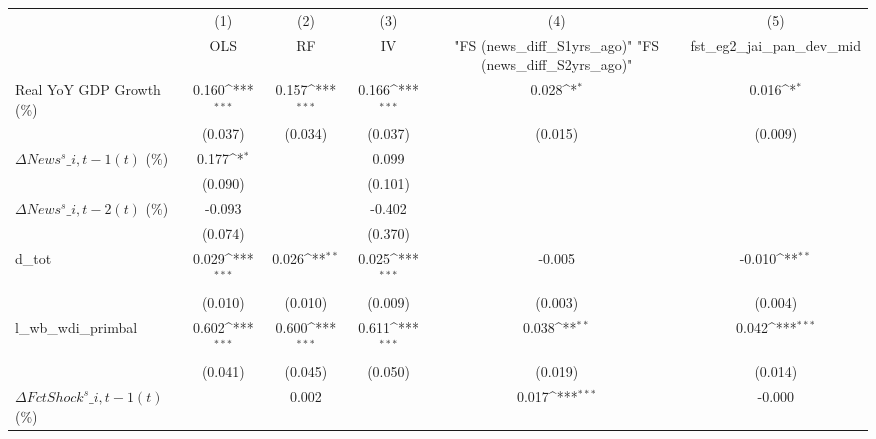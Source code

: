 {
\def\sym#1{\ifmmode^{#1}\else\(^{#1}\)\fi}
\begin{tabular}{l*{5}{c}}
\toprule
                    &\multicolumn{1}{c}{(1)}&\multicolumn{1}{c}{(2)}&\multicolumn{1}{c}{(3)}&\multicolumn{1}{c}{(4)}&\multicolumn{1}{c}{(5)}\\
                    &\multicolumn{1}{c}{OLS}&\multicolumn{1}{c}{RF}&\multicolumn{1}{c}{IV}&\multicolumn{1}{c}{ "FS (news\_diff\_S1yrs\_ago)"  "FS (news\_diff\_S2yrs\_ago)" }&\multicolumn{1}{c}{fst\_eg2\_jai\_pan\_dev\_mid}\\
\midrule
Real YoY GDP Growth (\%)&       0.160\sym{***}&       0.157\sym{***}&       0.166\sym{***}&       0.028\sym{*}  &       0.016\sym{*}  \\
                    &     (0.037)         &     (0.034)         &     (0.037)         &     (0.015)         &     (0.009)         \\
\addlinespace
$ \Delta News^s\_{i,t-1}(t)$ (\%)&       0.177\sym{*}  &                     &       0.099         &                     &                     \\
                    &     (0.090)         &                     &     (0.101)         &                     &                     \\
\addlinespace
$ \Delta News^s\_{i,t-2}(t)$ (\%)&      -0.093         &                     &      -0.402         &                     &                     \\
                    &     (0.074)         &                     &     (0.370)         &                     &                     \\
\addlinespace
d\_tot               &       0.029\sym{***}&       0.026\sym{**} &       0.025\sym{***}&      -0.005         &      -0.010\sym{**} \\
                    &     (0.010)         &     (0.010)         &     (0.009)         &     (0.003)         &     (0.004)         \\
\addlinespace
l\_wb\_wdi\_primbal    &       0.602\sym{***}&       0.600\sym{***}&       0.611\sym{***}&       0.038\sym{**} &       0.042\sym{***}\\
                    &     (0.041)         &     (0.045)         &     (0.050)         &     (0.019)         &     (0.014)         \\
\addlinespace
$ \Delta FctShock^s\_{i,t-1}(t)$ (\%)&                     &       0.002         &                     &       0.017\sym{***}&      -0.000         \\

\end{tabular}}
